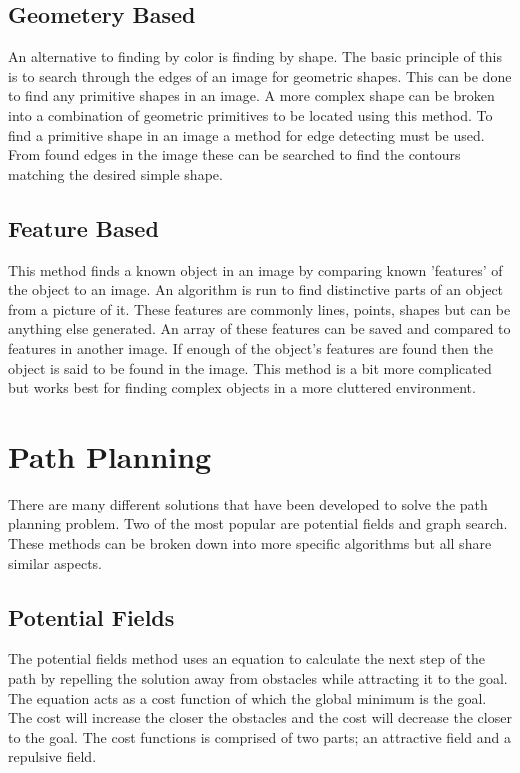 \subsection{Geometery Based}
An alternative to finding by color is finding by shape. The basic principle of this is to search through the edges of an image for geometric shapes. This can be done to find any primitive shapes in an image. A more complex shape can be broken into a combination of geometric primitives to be located using this method. To find a primitive shape in an image a method for edge detecting must be used. From found edges in the image these can be searched to find the contours matching the desired simple shape.

\subsection{Feature Based}
This method finds a known object in an image by comparing known 'features' of the object to an image. An algorithm is run to find distinctive parts of an object from a picture of it. These features are commonly lines, points, shapes but can be anything else generated. An array of these features can be saved and compared to features in another image. If enough of the object's features are found then the object is said to be found in the image. This method is a bit more complicated but works best for finding complex objects in a more cluttered environment.      

\section{Path Planning}
There are many different solutions that have been developed to solve the path planning problem. Two of the most popular are potential fields and graph search. These methods can be broken down into more specific algorithms but all share similar aspects.

\subsection{Potential Fields}
The potential fields method uses an equation to calculate the next step of the path by repelling the solution away from obstacles while attracting it to the goal. The equation acts as a cost function of which the global minimum is the goal. The cost will increase the closer the obstacles and the cost will decrease the closer to the goal. The cost functions is comprised of two parts; an attractive field and a repulsive field. 

